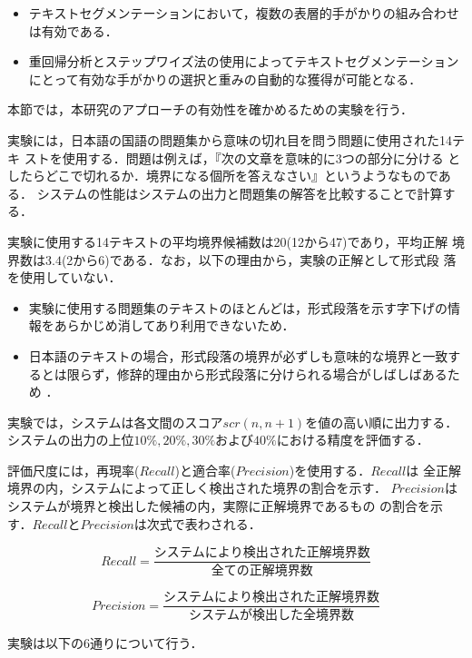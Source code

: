 \begin{itemize}
\item テキストセグメンテーションにおいて，複数の表層的手がかりの組み合わせ
は有効である．
\item 重回帰分析とステップワイズ法の使用によってテキストセグメンテーション
にとって有効な手がかりの選択と重みの自動的な獲得が可能となる．
\end{itemize}
本節では，本研究のアプローチの有効性を確かめるための実験を行う．

実験には，日本語の国語の問題集から意味の切れ目を問う問題に使用された14テキ
ストを使用する．問題は例えば，『次の文章を意味的に3つの部分に分ける
としたらどこで切れるか．境界になる個所を答えなさい』というようなものである．
システムの性能はシステムの出力と問題集の解答を比較することで計算する．

実験に使用する14テキストの平均境界候補数は20(12から47)であり，平均正解
境界数は$3.4$(2から6)である．なお，以下の理由から，実験の正解として形式段
落を使用していない．

\begin{itemize}
\item 実験に使用する問題集のテキストのほとんどは，形式段落を示す字下げの情
報をあらかじめ消してあり利用できないため．
\item 日本語のテキストの場合，形式段落の境界が必ずしも意味的な境界と一致す
るとは限らず，修辞的理由から形式段落に分けられる場合がしばしばあるため
\cite{tokoro}．
\end{itemize}

実験では，システムは各文間のスコア$scr(n,n+1)$を値の高い順に出力する．
システムの出力の上位$10\%,20\%,30\%$および$40\%$における精度を評価する．

評価尺度には，再現率($Recall$)と適合率($Precision$)を使用する．$Recall$は
全正解境界の内，システムによって正しく検出された境界の割合を示す．
$Precision$はシステムが境界と検出した候補の内，実際に正解境界であるもの
の割合を示す．$Recall$と$Precision$は次式で表わされる．

\begin{equation}
Recall = \frac{システムにより検出された正解境界数}{全ての正解境界数}
\end{equation}

\begin{equation}
Precision = \frac{システムにより検出された正解境界数}{システムが検出した全
境界数}
\end{equation}

実験は以下の6通りについて行う．

